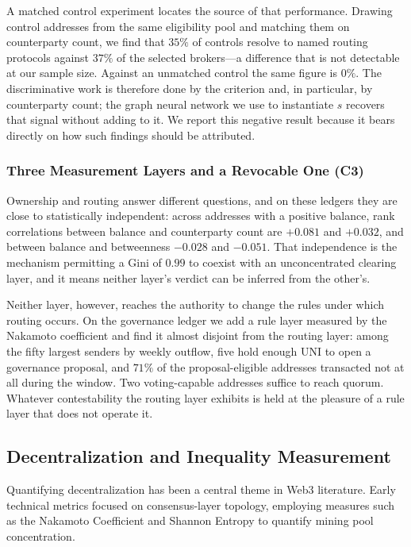 \documentclass[final,5p,times]{elsarticle}
\begin{document}
A matched control experiment locates the source of that performance. Drawing
control addresses from the same eligibility pool and matching them on
counterparty count, we find that $35\%$ of controls resolve to named routing
protocols against $37\%$ of the selected brokers---a difference that is not
detectable at our sample size. Against an unmatched control the same figure
is $0\%$. The discriminative work is therefore done by the criterion and, in
particular, by counterparty count; the graph neural network we use to
instantiate $s$ recovers that signal without adding to it. We report this
negative result because it bears directly on how such findings should be
attributed.

\subsubsection{Three Measurement Layers and a Revocable One (C3)}
Ownership and routing answer different questions, and on these ledgers they
are close to statistically independent: across addresses with a positive
balance, rank correlations between balance and counterparty count are
$+0.081$ and $+0.032$, and between balance and betweenness $-0.028$ and
$-0.051$. That independence is the mechanism permitting a Gini of $0.99$ to
coexist with an unconcentrated clearing layer, and it means neither layer's
verdict can be inferred from the other's.

Neither layer, however, reaches the authority to change the rules under which
routing occurs. On the governance ledger we add a rule layer measured by the
Nakamoto coefficient and find it almost disjoint from the routing layer:
among the fifty largest senders by weekly outflow, five hold enough UNI to
open a governance proposal, and $71\%$ of the proposal-eligible addresses
transacted not at all during the window. Two voting-capable addresses suffice
to reach quorum. Whatever contestability the routing layer exhibits is held
at the pleasure of a rule layer that does not operate it.

\subsection{Decentralization and Inequality Measurement}
Quantifying decentralization has been a central theme in Web3 literature. Early technical metrics focused on consensus-layer topology, employing measures such as the Nakamoto Coefficient \cite{grajales2022measuring} and Shannon Entropy to quantify mining pool concentration.
\end{document}
